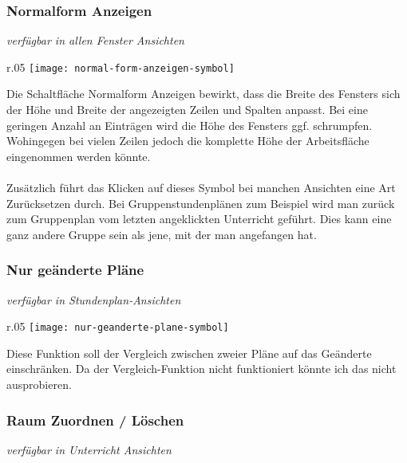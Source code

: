 \newpage

\subsubsection{Normalform Anzeigen}
{\small\textit{verfügbar in allen Fenster Ansichten\\}\par}

\begin{wrapfigure}{r}{.05\textwidth}
	\vspace{-50pt}
	\texttt{[image: normal-form-anzeigen-symbol]}
	\vspace{-35pt}
\end{wrapfigure}

\noindent
Die Schaltfläche Normalform Anzeigen bewirkt, dass die Breite des Fensters sich der Höhe und Breite der angezeigten Zeilen und Spalten anpasst. Bei eine geringen Anzahl an Einträgen wird die Höhe des Fensters ggf. schrumpfen. Wohingegen bei vielen Zeilen jedoch die komplette Höhe der Arbeitsfläche eingenommen werden könnte.\\
\\
Zusätzlich führt das Klicken auf dieses Symbol bei manchen Ansichten eine Art Zurücksetzen durch. Bei Gruppenstundenplänen zum Beispiel wird man zurück zum Gruppenplan vom letzten angeklickten Unterricht geführt. Dies kann eine ganz andere Gruppe sein als jene, mit der man angefangen hat.\\

\subsubsection{Nur geänderte Pläne}
{\small\textit{verfügbar in Stundenplan-Ansichten\\}\par}

\begin{wrapfigure}{r}{.05\textwidth}
	\vspace{-50pt}
	\texttt{[image: nur-geanderte-plane-symbol]}
	\vspace{-35pt}
\end{wrapfigure}

\noindent %
Diese Funktion soll der Vergleich zwischen zweier Pläne auf das Geänderte einschränken. Da der Vergleich-Funktion nicht funktioniert könnte ich das nicht ausprobieren.

\subsubsection{Raum Zuordnen / Löschen}
\label{subsubsec:raum-zuordnen-loschen}
{\small\textit{verfügbar in Unterricht Ansichten\\}\par}

